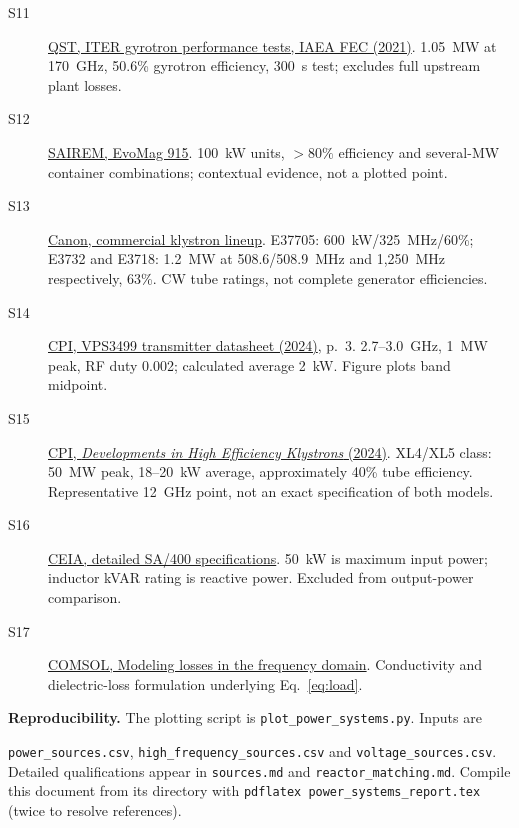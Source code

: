 \documentclass[10pt,a4paper]{article}
\begin{document}
\begin{description}
\item[S11] \href{https://conferences.iaea.org/event/214/contributions/17030/}{QST, ITER gyrotron performance tests, IAEA FEC (2021)}. 1.05~MW at 170~GHz, 50.6\% gyrotron efficiency, 300~s test; excludes full upstream plant losses.
\item[S12] \href{https://www.sairem.com/microwave-radiofrequency-equipment/industrial-generators/evomag-915-mhz-magnetron-generator/}{SAIREM, EvoMag 915}. 100~kW units, $>80\%$ efficiency and several-MW container combinations; contextual evidence, not a plotted point.
\item[S13] \href{https://etd.canon/en/product/category/microwave/klystron.html}{Canon, commercial klystron lineup}. E37705: 600~kW/325~MHz/60\%; E3732 and E3718: 1.2~MW at 508.6/508.9~MHz and 1,250~MHz respectively, 63\%. CW tube ratings, not complete generator efficiencies.
\item[S14] \href{https://www.cpi-edb.com/docs/datasheets/163/VPS3499%20KLYSTRON%20TRANS%20%20NF%20FINAL%2012-19-24.pdf}{CPI, VPS3499 transmitter datasheet (2024)}, p.~3. 2.7--3.0~GHz, 1~MW peak, RF duty 0.002; calculated average 2~kW. Figure plots band midpoint.
\item[S15] \href{https://indico.jlab.org/event/722/contributions/13920/}{CPI, \emph{Developments in High Efficiency Klystrons} (2024)}. XL4/XL5 class: 50~MW peak, 18--20~kW average, approximately 40\% tube efficiency. Representative 12~GHz point, not an exact specification of both models.
\item[S16] \href{https://induction.ceia.net/it-IO/product/power-cube-sa-400-series}{CEIA, detailed SA/400 specifications}. 50~kW is maximum input power; inductor kVAR rating is reactive power. Excluded from output-power comparison.
\item[S17] \href{https://doc.comsol.com/6.3/doc/com.comsol.help.acdc/acdc_ug_modeling.06.24.html}{COMSOL, Modeling losses in the frequency domain}. Conductivity and dielectric-loss formulation underlying Eq.~\ref{eq:load}.
\end{description}
\raggedright

\textbf{Reproducibility.} The plotting script is \texttt{plot\_power\_systems.py}. Inputs are\par
\texttt{power\_sources.csv}, \texttt{high\_frequency\_sources.csv} and \texttt{voltage\_sources.csv}. Detailed qualifications appear in \texttt{sources.md} and \texttt{reactor\_matching.md}. Compile this document from its directory with \texttt{pdflatex power\_systems\_report.tex} (twice to resolve references).
\end{document}
